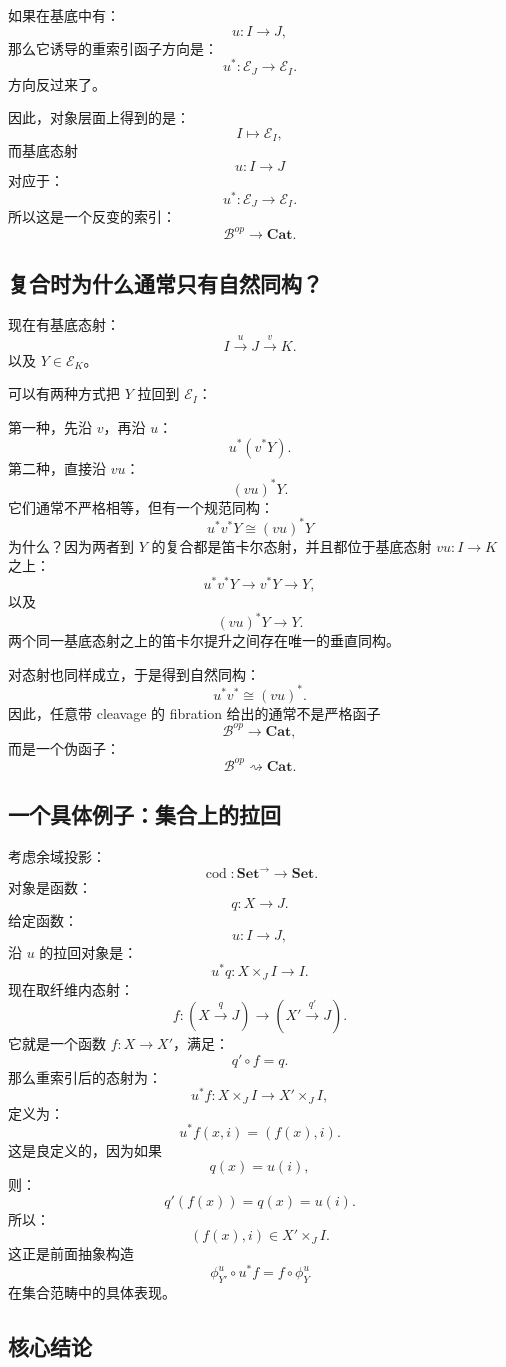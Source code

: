 \documentclass[12pt,a4paper]{article}
\begin{document}
如果在基底中有：
\[
u:I\to J,
\]
那么它诱导的重索引函子方向是：
\[
u^*:\mathcal{E}_J\to\mathcal{E}_I.
\]
方向反过来了。

因此，对象层面上得到的是：
\[
I\longmapsto\mathcal{E}_I,
\]
而基底态射
\[
u:I\to J
\]
对应于：
\[
u^*:\mathcal{E}_J\to\mathcal{E}_I.
\]
所以这是一个反变的索引：
\[
\mathcal{B}^{op}\to\mathbf{Cat}.
\]

\subsection{复合时为什么通常只有自然同构？}

现在有基底态射：
\[
I\xrightarrow{u}J\xrightarrow{v}K.
\]
以及 \(Y\in\mathcal{E}_K\)。

可以有两种方式把 \(Y\) 拉回到 \(\mathcal{E}_I\)：

第一种，先沿 \(v\)，再沿 \(u\)：
\[
u^*(v^*Y).
\]
第二种，直接沿 \(vu\)：
\[
(vu)^*Y.
\]
它们通常不严格相等，但有一个规范同构：
\[
\boxed{
u^*v^*Y\cong(vu)^*Y
}
\]
为什么？因为两者到 \(Y\) 的复合都是笛卡尔态射，并且都位于基底态射 \(vu:I\to K\) 之上：
\[
u^*v^*Y\to v^*Y\to Y,
\]
以及
\[
(vu)^*Y\to Y.
\]
两个同一基底态射之上的笛卡尔提升之间存在唯一的垂直同构。

对态射也同样成立，于是得到自然同构：
\[
u^*v^*\cong(vu)^*.
\]
因此，任意带 cleavage 的 fibration 给出的通常不是严格函子
\[
\mathcal{B}^{op}\to\mathbf{Cat},
\]
而是一个伪函子：
\[
\mathcal{B}^{op}\rightsquigarrow\mathbf{Cat}.
\]

\subsection{一个具体例子：集合上的拉回}

考虑余域投影：
\[
\operatorname{cod}:\mathbf{Set}^{\to}\to\mathbf{Set}.
\]
对象是函数：
\[
q:X\to J.
\]
给定函数：
\[
u:I\to J,
\]
沿 \(u\) 的拉回对象是：
\[
u^*q:
X\times_J I\to I.
\]
现在取纤维内态射：
\[
f:(X\xrightarrow{q} J)\to(X'\xrightarrow{q'}J).
\]
它就是一个函数 \(f:X\to X'\)，满足：
\[
q'\circ f=q.
\]
那么重索引后的态射为：
\[
u^*f:X\times_J I\to X'\times_J I,
\]
定义为：
\[
u^*f(x,i)=(f(x),i).
\]
这是良定义的，因为如果
\[
q(x)=u(i),
\]
则：
\[
q'(f(x))
=
q(x)
=
u(i).
\]
所以：
\[
(f(x),i)\in X'\times_J I.
\]
这正是前面抽象构造
\[
\phi_{Y'}^u\circ u^*f
=
f\circ\phi_Y^u
\]
在集合范畴中的具体表现。

\subsection{核心结论}
\end{document}
